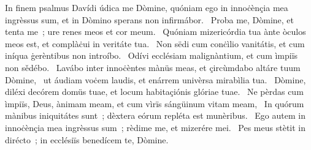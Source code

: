 { In finem psalmus Davídi}
{%
údica me Dòmine, quóniam ego in innoċènçia mea ingrèssus sum, et in Dòmino sperans non infirmábor. 
~Proba me, Dòmine, et tenta me~; ure renes meos et cor meum. 
~Quóniam mizericórdia tua ànte òculos meos est, et complàċui in veritáte tua. 
~Non sëdi cum conċìlio vanitátis, et cum iníqua ġerèntibus non introíbo. 
~Odívi ecclésiam malignàntium, et cum ìmpiïs non sědébo. 
~Lavábo inter innoċèntes mànüs meas, et çircùmdabo altáre tuum Dòmine, 
~ut áudiam voċem laudis, et enárrem univèrsa mirabìlia tua. 
~Dòmine, diléxi decórem domüs tuae, et locum habitaçiónis glóriae tuae. 
~Ne pèrdas cum ìmpiïs, Deus, ànimam meam, et cum vìrïs sángüinum vitam meam, 
~In quórum mànibus iniquitátes sunt~; dèxtera eórum repléta est munèribus. 
~Ego autem in innoċènçia mea ingrèssus sum~; rèdime me, et mizerére mei. 
~Pes meus stètit in dirécto~; in ecclésiïs benedícem te, Dòmine. 
}
